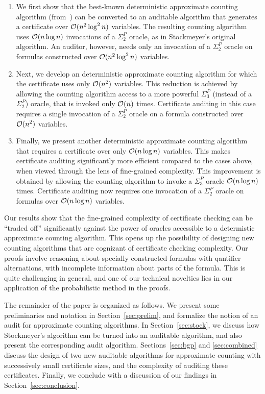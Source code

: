 \begin{enumerate}
\item We first show that the best-known deterministic approximate
counting algorithm (from~\cite{stockmeyer}) can be converted to an
auditable algorithm that generates a certificate over $\mathcal{O}(n^2\log^2
n)$ variables.  The resulting counting algorithm uses
$\mathcal{O}(n\log n)$ invocations of a $\Sigma_2^P$ oracle, as in
Stockmeyer's original algorithm.  An auditor, however,
needs only an invocation of a $\Sigma_2^P$ oracle on formulas
constructed over $\mathcal{O}(n^2\log^2 n)$ variables.
\item Next, we develop an deterministic approximate counting algorithm for which the certificate uses only $\mathcal{O}(n^2)$ variables.  This reduction is achieved by allowing the counting algorithm access to a more powerful $\Sigma_3^P$ (instead of a
$\Sigma_2^P$) oracle, that is invoked only $\mathcal{O}(n)$ times.
Certificate auditing in this case requires a single invocation of a
$\Sigma_2^P$ oracle on a formula constructed over $\mathcal{O}(n^2)$
variables.
\item Finally, we present another deterministic approximate
counting algorithm that requires a certificate over only $\mathcal{O}(n \log
n)$ variables.  This makes certificate auditing significantly more
efficient compared to the cases above, when viewed through the lens of
fine-grained complexity.  This improvement is obtained by allowing the
counting algorithm to invoke a $\Sigma_3^P$ oracle $\mathcal{O}(n \log n)$
times. Certificate auditing now requires one invocation of a
$\Sigma_2^P$ oracle on formulas over $\mathcal{O}(n \log n)$ variables.
\end{enumerate}
Our results show that the fine-grained complexity of certificate
checking can be ``traded off'' significantly against the power of
oracles accessible to a determistic approximate counting algorithm.
This opens up the possibility of designing new counting algorithms
that are cognizant of certificate checking complexity. Our
proofs involve reasoning about specially constructed formulas with
qantifier alternations, with incomplete information about parts of the
formula.  
This is quite challenging in general, and one of our technical novelties lies in our application of the probabilistic method in the proofs.



The remainder of the paper is organized as follows.  We present
some preliminaries and notation in Section~\ref{sec:prelim}, and
formalize the notion of an audit for approximate counting
algorithms.  In Section~\ref{sec:stock}, we discuss how Stockmeyer's algorithm can be turned into an auditable algorithm, and also present the corresponding audit algorithm. Sections~\ref{sec:bgp} and \ref{sec:combined} discuss the
design of two new auditable algorithms for approximate counting
with successively small certificate sizes, and the complexity
of auditing these certificates.  Finally, we conclude with
a discussion of our findings in Section~\ref{sec:conclusion}. 

